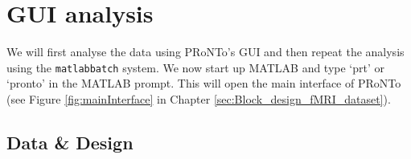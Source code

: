 \section{GUI analysis}

We will first analyse the data using PRoNTo's GUI and then repeat the analysis using the {\tt matlabbatch} system. We now start up MATLAB and type `prt' or `pronto' in the MATLAB prompt. This will open the main interface of PRoNTo (see Figure \ref{fig:mainInterface} in Chapter \ref{sec:Block_design_fMRI_dataset}).

\subsection{Data \& Design}

